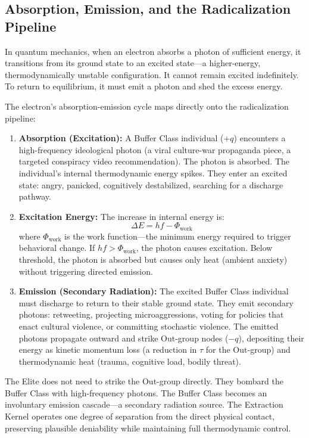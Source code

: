 \subsection{Absorption, Emission, and the Radicalization Pipeline}

In quantum mechanics, when an electron absorbs a photon of sufficient energy, it transitions from its ground state to an excited state---a higher-energy, thermodynamically unstable configuration. It cannot remain excited indefinitely. To return to equilibrium, it must emit a photon and shed the excess energy.

\begin{definition}
The electron's absorption-emission cycle maps directly onto the radicalization pipeline:
\begin{enumerate}
\item \textbf{Absorption (Excitation):} A Buffer Class individual ($+q$) encounters a high-frequency ideological photon (a viral culture-war propaganda piece, a targeted conspiracy video recommendation). The photon is absorbed. The individual's internal thermodynamic energy spikes. They enter an excited state: angry, panicked, cognitively destabilized, searching for a discharge pathway.

\item \textbf{Excitation Energy:} The increase in internal energy is:
\begin{equation}\label{eq:15.qed-excitation}
\Delta E = hf - \Phi_{\text{work}}
\end{equation}
where $\Phi_{\text{work}}$ is the work function---the minimum energy required to trigger behavioral change. If $hf > \Phi_{\text{work}}$, the photon causes excitation. Below threshold, the photon is absorbed but causes only heat (ambient anxiety) without triggering directed emission.

\item \textbf{Emission (Secondary Radiation):} The excited Buffer Class individual must discharge to return to their stable ground state. They emit secondary photons: retweeting, projecting microaggressions, voting for policies that enact cultural violence, or committing stochastic violence. The emitted photons propagate outward and strike Out-group nodes ($-q$), depositing their energy as kinetic momentum loss (a reduction in $\tau$ for the Out-group) and thermodynamic heat (trauma, cognitive load, bodily threat).
\end{enumerate}

The Elite does not need to strike the Out-group directly. They bombard the Buffer Class with high-frequency photons. The Buffer Class becomes an involuntary emission cascade---a secondary radiation source. The Extraction Kernel operates one degree of separation from the direct physical contact, preserving plausible deniability while maintaining full thermodynamic control.
\end{definition}

